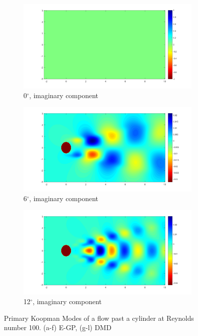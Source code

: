 \documentclass[letterpaper,12pt,peerreviewca,draftcls]{IEEEtran}
\begin{document}
\begin{figure}[h]
\begin{subfigure}[t]{0.30\textwidth}
	\end{subfigure}
	\begin{subfigure}[t]{0.30\textwidth}
		\includegraphics[width=\linewidth]{"Figure 16j"}
		\caption{0$^\circ$, imaginary component}
	\end{subfigure}
	\begin{subfigure}[t]{0.30\textwidth}
		\includegraphics[width=\linewidth]{"Figure 16k"}
		\caption{6$^\circ$, imaginary component}
	\end{subfigure}
	\begin{subfigure}[t]{0.30\textwidth}
		\includegraphics[width=\linewidth]{"Figure 16l"}
		\caption{12$^\circ$, imaginary component}
	\end{subfigure}

	\caption{Primary Koopman Modes of a flow past a cylinder at Reynolds number 100. (a-f) E-GP, (g-l) DMD}
	\label{fig:cfd_100_modes}
\end{figure}
\end{document}

